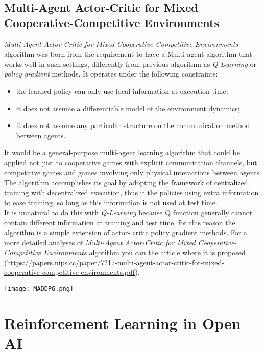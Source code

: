\documentclass[]{report}
\begin{document}
\section{Multi-Agent Actor-Critic for Mixed	Cooperative-Competitive Environments}
\emph{Multi-Agent Actor-Critic for Mixed Cooperative-Competitive Environments} algorithm was born from the requirement to have a Multi-agent algorithm that works well in such settings, differently from previous algorithm as \emph{Q-Learning} or \emph{policy gradient} methods.
It operates under the following constraints:
\begin{itemize}
	\item the learned policy can only use local information at execution time;
	\item it does not assume a differentiable model of the environment dynamics;
	\item it does not assume any particular structure on the communication method between agents.
\end{itemize}

It would be a general-purpose multi-agent learning algorithm that could be applied not just to cooperative games with explicit communication channels, but competitive games and games involving only physical interactions between agents.
The algorithm accomplishes its goal by adopting the framework of centralized training with decentralized execution, thus it the policies using extra information to ease training, so long as this information is not used at test time.\\
It is unnatural to do this with \emph{Q-Learning} because Q function generally cannot contain different information at training and test time, for this reason the algorithm is a simple extension of actor- critic policy gradient methods.
For a more detailed analyses of \emph{Multi-Agent Actor-Critic for Mixed Cooperative-Competitive Environments} algorithm you can the article where it is proposed    (\url{https://papers.nips.cc/paper/7217-multi-agent-actor-critic-for-mixed-cooperative-competitive-environments.pdf}).

\vspace{30 mm}

\begin{center}
	\texttt{[image: MADDPG.png]}
\end{center}




\chapter{Reinforcement Learning in Open AI}
\end{document}
